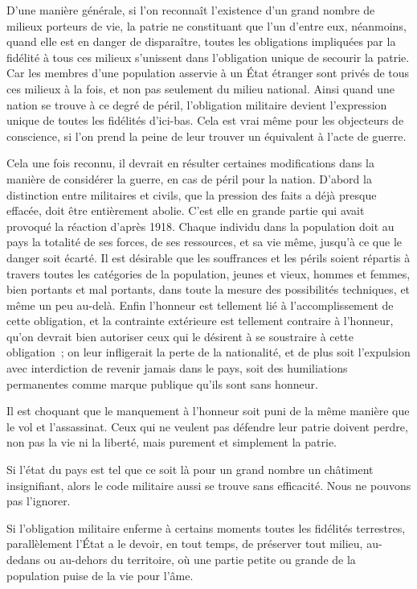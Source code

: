 \documentclass[french,twoside]{book} %
\begin{document}
D'une manière générale, si l'on reconnaît l'existence d'un grand nombre de milieux porteurs de vie, la patrie ne constituant que l'un d'entre eux, néanmoins, quand elle est en danger de disparaître, toutes les obligations impliquées par la fidélité à tous ces milieux s'unissent dans l'obligation unique de secourir la patrie. Car les membres d'une population asservie à un État étranger sont privés de tous ces milieux à la fois, et non pas seulement du milieu national. Ainsi quand une nation se trouve à ce degré de péril, l'obligation militaire devient l'expression unique de toutes les fidélités d'ici-bas. Cela est vrai même pour les objecteurs de conscience, si l'on prend la peine de leur trouver un équivalent à l'acte de guerre.\par
Cela une fois reconnu, il devrait en résulter certaines modifications dans la manière de considérer la guerre, en cas de péril pour la nation. D'abord la distinction entre militaires et civils, que la pression des faits a déjà presque effacée, doit être entièrement abolie. C'est elle en grande partie qui avait provoqué la réaction d'après 1918. Chaque individu dans la population doit au pays la totalité de ses forces, de ses ressources, et sa vie même, jusqu'à ce que le danger soit écarté. Il est désirable que les souffrances et les périls soient répartis à travers toutes les catégories de la population, jeunes et vieux, hommes et femmes, bien portants et mal portants, dans toute la mesure des possibilités techniques, et même un peu au-delà. Enfin l'honneur est tellement lié à l'accomplissement de cette obligation, et la contrainte extérieure est tellement contraire à l'honneur, qu'on devrait bien autoriser ceux qui le désirent à se soustraire à cette obligation ; on leur infligerait la perte de la nationalité, et de plus soit l'expulsion avec interdiction de revenir jamais dans le pays, soit des humiliations permanentes comme marque publique qu'ils sont sans honneur.\par
Il est choquant que le manquement à l'honneur soit puni de la même manière que le vol et l'assassinat. Ceux qui ne veulent pas défendre leur patrie doivent perdre, non pas la vie ni la liberté, mais purement et simplement la patrie.\par
Si l'état du pays est tel que ce soit là pour un grand nombre un châtiment insignifiant, alors le code militaire aussi se trouve sans efficacité. Nous ne pouvons pas l'ignorer.\par
Si l'obligation militaire enferme à certains moments toutes les fidélités terrestres, parallèlement l'État a le devoir, en tout temps, de préserver tout milieu, au-dedans ou au-dehors du territoire, où une partie petite ou grande de la population puise de la vie pour l'âme.\par
\end{document}
